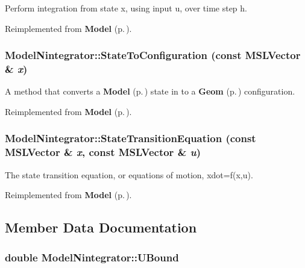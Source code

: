 Perform integration from state x, using input u, over time step h.



Reimplemented from {\bf Model} {\rm (p.\,\pageref{classModel_a5})}.
\subsubsection{ Model\-Nintegrator::State\-To\-Configuration (const {\bf MSLVector} \& {\em x})\hspace{0.3cm}{\tt  [virtual]}}\label{classModelNintegrator_a2}


A method that converts a {\bf Model} {\rm (p.\,\pageref{classModel})} state in to a {\bf Geom} {\rm (p.\,\pageref{classGeom})} configuration.



Reimplemented from {\bf Model} {\rm (p.\,\pageref{classModel_a8})}.
\subsubsection{ Model\-Nintegrator::State\-Transition\-Equation (const {\bf MSLVector} \& {\em x}, const {\bf MSLVector} \& {\em u})\hspace{0.3cm}{\tt  [virtual]}}\label{classModelNintegrator_a4}


The state transition equation, or equations of motion, xdot=f(x,u).



Reimplemented from {\bf Model} {\rm (p.\,\pageref{classModel_a3})}.

\subsection{Member Data Documentation}
\subsubsection{\setlength{\rightskip}{0pt plus 5cm}double Model\-Nintegrator::UBound}\label{classModelNintegrator_m0}



